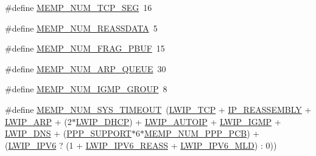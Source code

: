 \begin{DoxyCompactItemize}
\item 
\#define \hyperlink{group__lwip__opts__memp_gaa35fb3a1a76661e3ffb9722a57092de3}{M\+E\+M\+P\+\_\+\+N\+U\+M\+\_\+\+T\+C\+P\+\_\+\+S\+EG}~16
\item 
\#define \hyperlink{group__lwip__opts__memp_ga169436c5860253b90e25bdba9fdcac86}{M\+E\+M\+P\+\_\+\+N\+U\+M\+\_\+\+R\+E\+A\+S\+S\+D\+A\+TA}~5
\item 
\#define \hyperlink{group__lwip__opts__memp_ga1f66051a654dcd7a4e19bc6aff240630}{M\+E\+M\+P\+\_\+\+N\+U\+M\+\_\+\+F\+R\+A\+G\+\_\+\+P\+B\+UF}~15
\item 
\#define \hyperlink{group__lwip__opts__memp_ga087b00ea20a7edebcad33a1a1353a5d7}{M\+E\+M\+P\+\_\+\+N\+U\+M\+\_\+\+A\+R\+P\+\_\+\+Q\+U\+E\+UE}~30
\item 
\#define \hyperlink{group__lwip__opts__memp_gab648ff95d8ffa4216b95f82a568a5d9a}{M\+E\+M\+P\+\_\+\+N\+U\+M\+\_\+\+I\+G\+M\+P\+\_\+\+G\+R\+O\+UP}~8
\item 
\#define \hyperlink{group__lwip__opts__memp_ga4afbdca581a58d57bc7a81118a95327e}{M\+E\+M\+P\+\_\+\+N\+U\+M\+\_\+\+S\+Y\+S\+\_\+\+T\+I\+M\+E\+O\+UT}~(\hyperlink{group__lwip__opts__tcp_gaa4ed98deb97b77c633cb8870f34c71e9}{L\+W\+I\+P\+\_\+\+T\+CP} + \hyperlink{group__lwip__opts__ipv4_ga1a31ab0e0f37b17d40fa7c35bc2c4f69}{I\+P\+\_\+\+R\+E\+A\+S\+S\+E\+M\+B\+LY} + \hyperlink{group__lwip__opts__arp_ga9609a014bba4638cc191d6a8f9556c87}{L\+W\+I\+P\+\_\+\+A\+RP} + (2$\ast$\hyperlink{openmote-cc2538_2lwip_2test_2unit_2lwipopts_8h_a8a6ec62dc121064ac591b1fd8567bee9}{L\+W\+I\+P\+\_\+\+D\+H\+CP}) + \hyperlink{group__lwip__opts__autoip_gaaf1b3a089827223589baf1b7f4f57069}{L\+W\+I\+P\+\_\+\+A\+U\+T\+O\+IP} + \hyperlink{openmote-cc2538_2lwip_2test_2unit_2lwipopts_8h_adaf25915ae1fd69c0943ef68cbb38923}{L\+W\+I\+P\+\_\+\+I\+G\+MP} + \hyperlink{group__lwip__opts__dns_ga98710dd81446b7cb2daac736bae6f646}{L\+W\+I\+P\+\_\+\+D\+NS} + (\hyperlink{openmote-cc2538_2lwip_2src_2include_2netif_2ppp_2ppp__opts_8h_a746c0ebaef5399987d53a1426eba6273}{P\+P\+P\+\_\+\+S\+U\+P\+P\+O\+RT}$\ast$6$\ast$\hyperlink{openmote-cc2538_2lwip_2src_2include_2netif_2ppp_2ppp__opts_8h_a6721ea95cbd6afd6968470c2423b6482}{M\+E\+M\+P\+\_\+\+N\+U\+M\+\_\+\+P\+P\+P\+\_\+\+P\+CB}) + (\hyperlink{openmote-cc2538_2lwip_2test_2fuzz_2lwipopts_8h_a872e3bb3fe2212156d66b18fccc9643f}{L\+W\+I\+P\+\_\+\+I\+P\+V6} ? (1 + \hyperlink{group__lwip__opts__ipv6_gad0ef160d72e63b02c5e875b06ec53864}{L\+W\+I\+P\+\_\+\+I\+P\+V6\+\_\+\+R\+E\+A\+SS} + \hyperlink{group__lwip__opts__mld6_ga44d8f24eaebbc50221ac1336212a3528}{L\+W\+I\+P\+\_\+\+I\+P\+V6\+\_\+\+M\+LD}) \+: 0))

\end{DoxyCompactItemize}
